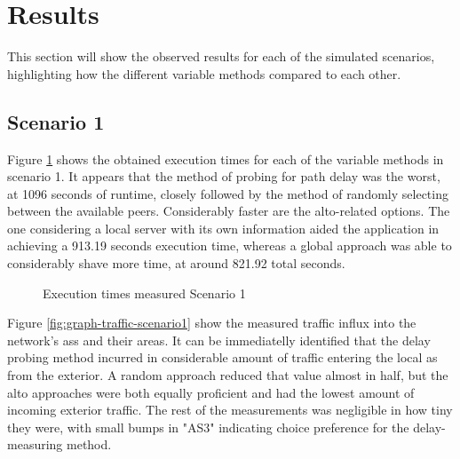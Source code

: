 \section{Results}

This section will show the observed results for each of the simulated scenarios, highlighting how the different variable methods compared to each other.

\subsection{Scenario 1}

Figure \ref{fig:graph-execution-scenario1} shows the obtained execution times for each of the variable methods in scenario 1.
It appears that the method of probing for path delay was the worst, at 1096 seconds of runtime, closely followed by the method of randomly selecting between the available peers.
Considerably faster are the \gls{alto}-related options.
The one considering a local server with its own information aided the application in achieving a 913.19 seconds execution time, whereas a global approach was able to considerably shave more time, at around 821.92 total seconds.

\begin{figure}[H]
\centering
{} %
\caption{Execution times measured Scenario 1}
\label{fig:graph-execution-scenario1}
\end{figure}

Figure \ref{fig:graph-traffic-scenario1} show the measured traffic influx into the network's \glspl{as} and their areas.
It can be immediatelly identified that the delay probing method incurred in considerable amount of traffic entering the local \gls{as} from the exterior.
A random approach reduced that value almost in half, but the \gls{alto} approaches were both equally proficient and had the lowest amount of incoming exterior traffic.
The rest of the measurements was negligible in how tiny they were, with small bumps in "AS3" indicating choice preference for the delay-measuring method.
 
